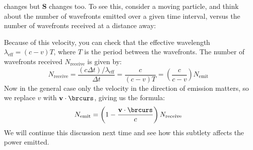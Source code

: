 \) changes but \( \mathbf{S} \) changes too. To see this, consider a moving particle, and think
about the number of wavefronts emitted over a given time interval, versus the number of wavefronts received
at a distance away:
\begin{center}
\end{center}
Because of this velocity, you can check that the effective wavelength \( \lambda_\text{eff} = (c - v) T \),
where \( T \) is the period between the wavefronts. 
The number of wavefronts received \( N_\text{receive} \) is given by:
\[
	N_\text{receive} = \frac{(c \Delta t) / \lambda_\text{eff}}{\Delta t} = \frac{c}{(c - v)T} = \left(
	\frac{c}{c - v} \right)N_\text{emit}
\]
Now in the general case only the velocity in the direction of emission matters, so we replace \( v \) with \(
\mathbf{v} \cdot \brcurs \), giving us the formula:
\[
	N_\text{emit} = \left( 1 - \frac{\mathbf{v} \cdot \brcurs}{c} \right)N_\text{receive}
\]
We will continue this discussion next time and see how this subtlety affects the power emitted.  
 
 
 
  

